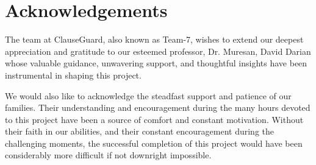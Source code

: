 
\section*{\centering Acknowledgements}









The team at ClauseGuard, also known as Team-7, wishes to extend our deepest appreciation and gratitude to our esteemed professor, Dr. Muresan, David Darian whose valuable guidance, unwavering support, and thoughtful insights have been instrumental in shaping this project. 

We would also like to acknowledge the steadfast support and patience of our families. Their understanding and encouragement during the many hours devoted to this project have been a source of comfort and constant motivation. Without their faith in our abilities, and their constant encouragement during the challenging moments, the successful completion of this project would have been considerably more difficult if not downright impossible. 
